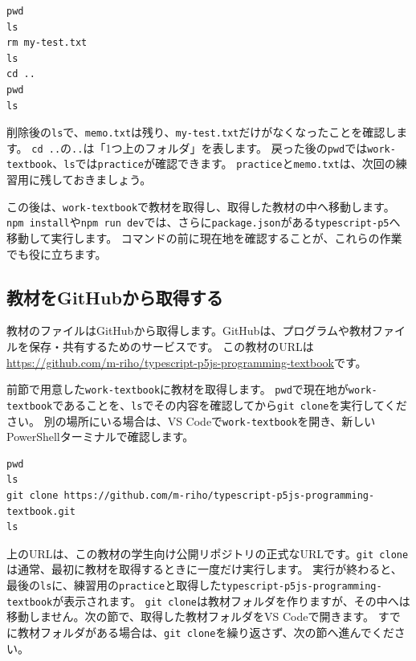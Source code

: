 \begin{listing}[H]
\begin{verbatim}
pwd
ls
rm my-test.txt
ls
cd ..
pwd
ls
\end{verbatim}
\caption{練習用のコピーを削除し、1つ上のフォルダへ戻る}
\label{lst:chapter01-cli-delete-return}
\end{listing}

削除後の\texttt{ls}で、\texttt{memo.txt}は残り、\texttt{my-test.txt}だけがなくなったことを確認します。
\texttt{cd ..}の\texttt{..}は「1つ上のフォルダ」を表します。
戻った後の\texttt{pwd}では\texttt{work-textbook}、\texttt{ls}では\texttt{practice}が確認できます。
\texttt{practice}と\texttt{memo.txt}は、次回の練習用に残しておきましょう。

この後は、\texttt{work-textbook}で教材を取得し、取得した教材の中へ移動します。
\texttt{npm install}や\texttt{npm run dev}では、さらに\texttt{package.json}がある\texttt{typescript-p5}へ移動して実行します。
コマンドの前に現在地を確認することが、これらの作業でも役に立ちます。

\subsection{教材をGitHubから取得する}

教材のファイルはGitHubから取得します。GitHubは、プログラムや教材ファイルを保存・共有するためのサービスです。
この教材のURLは\url{https://github.com/m-riho/typescript-p5js-programming-textbook}です。


前節で用意した\texttt{work-textbook}に教材を取得します。
\texttt{pwd}で現在地が\texttt{work-textbook}であることを、\texttt{ls}でその内容を確認してから\texttt{git clone}を実行してください。
別の場所にいる場合は、VS Codeで\texttt{work-textbook}を開き、新しいPowerShellターミナルで確認します。

\begin{listing}[htbp]
\begin{verbatim}
pwd
ls
git clone https://github.com/m-riho/typescript-p5js-programming-textbook.git
ls
\end{verbatim}
\caption{現在地を確認し、教材のリポジトリを取得するコマンド}
\label{lst:chapter01-git-clone}
\end{listing}

上のURLは、この教材の学生向け公開リポジトリの正式なURLです。\texttt{git clone}は通常、最初に教材を取得するときに一度だけ実行します。
実行が終わると、最後の\texttt{ls}に、練習用の\texttt{practice}と取得した\texttt{typescript-p5js-programming-textbook}が表示されます。
\texttt{git clone}は教材フォルダを作りますが、その中へは移動しません。次の節で、取得した教材フォルダをVS Codeで開きます。
すでに教材フォルダがある場合は、\texttt{git clone}を繰り返さず、次の節へ進んでください。


